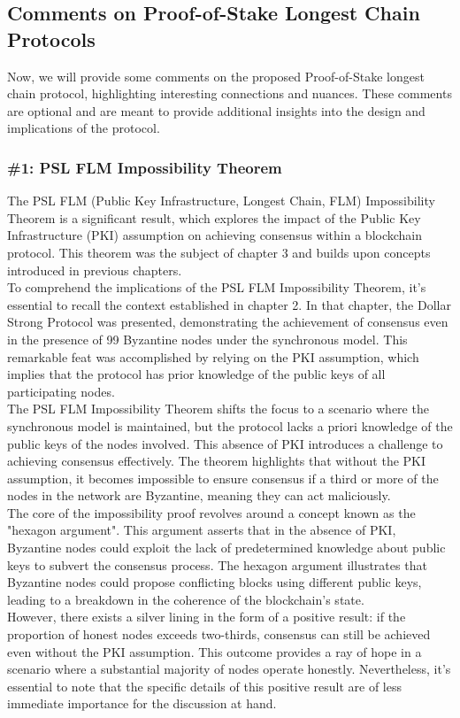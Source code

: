 \subsection{Comments on Proof-of-Stake Longest Chain Protocols}
Now, we will provide some comments on the proposed Proof-of-Stake longest chain protocol, highlighting interesting connections and nuances. These comments are optional and are meant to provide additional insights into the design and implications of the protocol.
\subsubsection{\#1: PSL FLM Impossibility Theorem}
The PSL FLM (Public Key Infrastructure, Longest Chain, FLM) Impossibility Theorem is a significant result, which explores the impact of the Public Key Infrastructure (PKI) assumption on achieving consensus within a blockchain protocol. This theorem was the subject of chapter 3 and builds upon concepts introduced in previous chapters.\\
To comprehend the implications of the PSL FLM Impossibility Theorem, it's essential to recall the context established in chapter 2. In that chapter, the Dollar Strong Protocol was presented, demonstrating the achievement of consensus even in the presence of 99 Byzantine nodes under the synchronous model. This remarkable feat was accomplished by relying on the PKI assumption, which implies that the protocol has prior knowledge of the public keys of all participating nodes.\\
The PSL FLM Impossibility Theorem shifts the focus to a scenario where the synchronous model is maintained, but the protocol lacks a priori knowledge of the public keys of the nodes involved. This absence of PKI introduces a challenge to achieving consensus effectively. The theorem highlights that without the PKI assumption, it becomes impossible to ensure consensus if a third or more of the nodes in the network are Byzantine, meaning they can act maliciously.\\
The core of the impossibility proof revolves around a concept known as the "hexagon argument". This argument asserts that in the absence of PKI, Byzantine nodes could exploit the lack of predetermined knowledge about public keys to subvert the consensus process. The hexagon argument illustrates that Byzantine nodes could propose conflicting blocks using different public keys, leading to a breakdown in the coherence of the blockchain's state.\\
However, there exists a silver lining in the form of a positive result: if the proportion of honest nodes exceeds two-thirds, consensus can still be achieved even without the PKI assumption. This outcome provides a ray of hope in a scenario where a substantial majority of nodes operate honestly. Nevertheless, it's essential to note that the specific details of this positive result are of less immediate importance for the discussion at hand.\\
